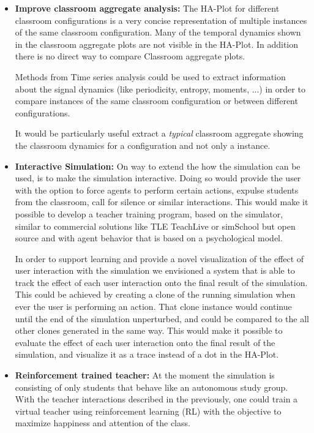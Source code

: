 \begin{itemize}
    \item \textbf{Improve classroom aggregate analysis:}
    The HA-Plot for different classroom configurations is a very concise representation
    of multiple instances of the same classroom configuration. Many of the temporal
    dynamics shown in the classroom aggregate plots are not visible in the HA-Plot.
    In addition there is no direct way to compare Classroom aggregate plots.

    \bb

    Methods from Time series analysis could be used to extract information about
    the signal dynamics (like periodicity, entropy, moments, ...) in order to compare
    instances of the same classroom configuration or between different configurations.

    \bb

    It would be particularly useful extract a \textit{typical} classroom aggregate
    showing the classroom dynamics for a configuration and not only a instance.
    \item \textbf{Interactive Simulation:} 
    On way to extend the how the simulation can be used, is to make the simulation
    interactive. Doing so would provide the user with the option to force agents
    to perform certain actions, expulse students from the classroom, call for silence
    or similar interactions. This would make it possible to develop a teacher training 
    program, based on the simulator, similar to commercial solutions like TLE TeachLive
    \cite{Dieker2017} or simSchool \cite{Badiee2015} but open source and with
    agent behavior that is based on a psychological model.
    
    \bb
    
    In order to support learning and provide a novel visualization of the effect
    of user interaction with the simulation we envisioned a system that is able to track
    the effect of each user interaction onto the final result of the simulation.
    This could be achieved by creating a clone of the running simulation when ever
    the user is performing an action. That clone instance would continue until the 
    end of the simulation unperturbed, and could be compared to the all other clones
    generated in the same way. This would make it possible to evaluate the effect
    of each user interaction onto the final result of the simulation, and visualize it
    as a trace instead of a dot in the HA-Plot.

    \item \textbf{Reinforcement trained teacher:} At the moment the simulation
    is consisting of only students that behave like an autonomous study group.
    With the teacher interactions described in the previously, one could train a
    virtual teacher using reinforcement learning (RL) with
    the objective to maximize happiness and attention of the class.
    

\end{itemize}
